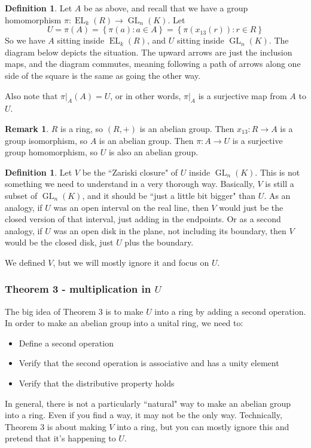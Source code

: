 \documentclass[12pt]{article}
\theoremstyle{definition}
\newtheorem{definition}[theorem]{Definition}
\newtheorem{remark}[theorem]{Remark}
\newcommand{\lb}{\left\{}
\newcommand{\rb}{\right\}}
\newcommand{\noi}{\noindent}
\DeclareMathOperator{\EL}{EL}
\DeclareMathOperator{\GL}{GL}
\begin{document}
\begin{definition}
Let $A$ be as above, and recall that we have a group homomorphism $\pi:\EL_k(R) \to \GL_n(K)$. Let
\[
	U = \pi(A) = \lb \pi(a) : a \in A \rb = \lb \pi ( x_{13}(r) ) : r \in R \rb 
\]
So we have $A$ sitting inside $\EL_k(R)$, and $U$ sitting inside $\GL_n(K)$. The diagram below depicts the situation. The upward arrows are just the inclusion maps, and the diagram commutes, meaning following a path of arrows along one side of the square is the same as going the other way.
\begin{center}
\end{center}
Also note that $\pi|_A(A) = U$, or in other words, $\pi|_A$ is a surjective map from $A$ to $U$.
\end{definition}

\begin{remark}
$R$ is a ring, so $(R,+)$ is an abelian group. Then $x_{13}:R \to A$ is a group isomorphism, so $A$ is an abelian group. Then $\pi:A \to U$ is a surjective group homomorphism, so $U$ is also an abelian group.
\end{remark}

\begin{definition}
Let $V$ be the ``Zariski closure" of $U$ inside $\GL_n(K)$. This is not something we need to understand in a very thorough way. Basically, $V$ is still a subset of $\GL_n(K)$, and it should be ``just a little bit bigger" than $U$. As an analogy, if $U$ was an open interval on the real line, then $V$ would just be the closed version of that interval, just adding in the endpoints. Or as a second analogy, if $U$ was an open disk in the plane, not including its boundary, then $V$ would be the closed disk, just $U$ plus the boundary.
\end{definition}

\noi We defined $V$, but we will mostly ignore it and focus on $U$.

\subsubsection*{Theorem 3 - multiplication in $U$}

The big idea of Theorem 3 is to make $U$ into a ring by adding a second operation. In order to make an abelian group into a unital ring, we need to:
\begin{itemize}
	\item Define a second operation
	\item Verify that the second operation is associative and has a unity element
	\item Verify that the distributive property holds
\end{itemize}
In general, there is not a particularly ``natural" way to make an abelian group into a ring. Even if you find a way, it may not be the only way. Technically, Theorem 3 is about making $V$ into a ring, but you can mostly ignore this and pretend that it's happening to $U$.
\end{document}
